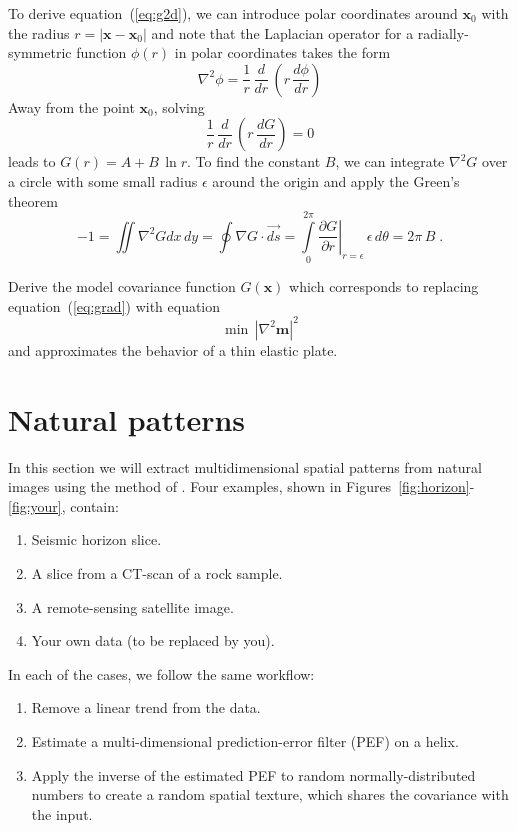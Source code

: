 To derive equation~(\ref{eq:g2d}), we can introduce polar coordinates
around $\mathbf{x}_0$ with the radius $r= |\mathbf{x}-\mathbf{x}_0|$
and note that the Laplacian operator for a radially-symmetric function
$\phi(r)$ in polar coordinates takes the form
\begin{equation}
\label{eq:polar}
\nabla^2 \phi = \displaystyle \frac{1}{r}\,\frac{d}{dr}\,\left(r\,\frac{d \phi}{dr}\right)
\end{equation}  
Away from the point $\mathbf{x}_0$, solving
\begin{equation}
\label{eq:away}
\frac{1}{r}\,\frac{d}{dr}\,\left(r\,\frac{d G}{dr}\right) = 0
\end{equation}
leads to $G(r) = A + B\,\ln r$. To find the constant $B$, we can
integrate $\nabla^2 G$ over a circle with some small radius $\epsilon$
around the origin and apply the Green's theorem
\begin{equation}
\label{eq:integrate}
-1 = \iint \nabla^2 G dx\,dy = \oint \nabla G \cdot \vec{ds} = 
\int\limits_{0}^{2\pi} \left.\frac{\partial G}{\partial r}\right|_{r=\epsilon}\,\epsilon\,d\theta = 2\pi\,B\;.
\end{equation}

Derive the model covariance function $G(\mathbf{x})$ which corresponds
to replacing equation~(\ref{eq:grad}) with equation
\begin{equation}
\label{eq:lap}
\min\,\left|\nabla^2 \mathbf{m}\right|^2
\end{equation} 
and approximates the behavior of a thin elastic plate.

\section{Natural patterns}

In this section we will extract multidimensional spatial patterns from
natural images using the method of \cite{textures}. Four examples,
shown in Figures~\ref{fig:horizon}-\ref{fig:your}, contain:
\begin{enumerate}
\item Seismic horizon slice.
\item A slice from a CT-scan of a rock sample.
\item A remote-sensing satellite image.
\item Your own data (to be replaced by you).
\end{enumerate}
In each of the cases, we follow the same workflow:
\begin{enumerate}
\item Remove a linear trend from the data.
\item Estimate a multi-dimensional prediction-error filter (PEF) on a helix.
\item Apply the inverse of the estimated PEF to random normally-distributed numbers
  to create a random spatial texture, which shares the covariance with the input. 
\end{enumerate}

